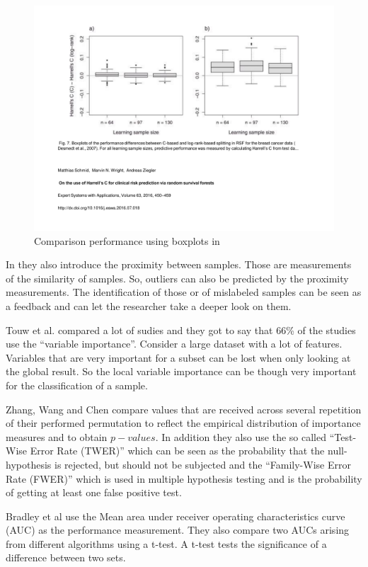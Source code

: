 \documentclass{sig-alternate-05-2015}
\begin{document}
\begin{figure}
\centering
\includegraphics[width=5in]{harrellscbox}
\caption{Comparison performance using boxplots in \cite{Schmid2016450}}
\label{fig:harrellscbox}
\end{figure}

In \cite{schwarz2010safari} they also introduce the proximity between samples. Those are measurements of the similarity of samples. So, outliers can also be predicted by the proximity measurements. The identification of those or of mislabeled samples can be seen as a feedback and can let the researcher take a deeper look on them.

Touw et al. compared a lot of sudies and they got to say that 66\% of the studies use the ``variable importance''. Consider a large dataset with a lot of features. Variables that are very important for a subset can be lost when only looking at the global result. So the local variable importance can be though very important for the classification of a sample.

Zhang, Wang and Chen \cite{zhang2009willows} compare values that are received across several repetition of their performed permutation to reflect the empirical distribution of importance measures and to obtain $p-values$. In addition they also use the so called ``Test-Wise Error Rate (TWER)'' which can be seen as the probability that the null-hypothesis is rejected, but should not be subjected and the ``Family-Wise Error Rate (FWER)'' which is used in multiple hypothesis testing and is the probability of getting at least one false positive test.

Bradley et al \cite{maken2014multiple} use the Mean area under receiver operating characteristics curve (AUC) as the performance measurement. They also compare two AUCs arising from different algorithms using a t-test. A t-test tests the significance of a difference between two sets.
\end{document}
